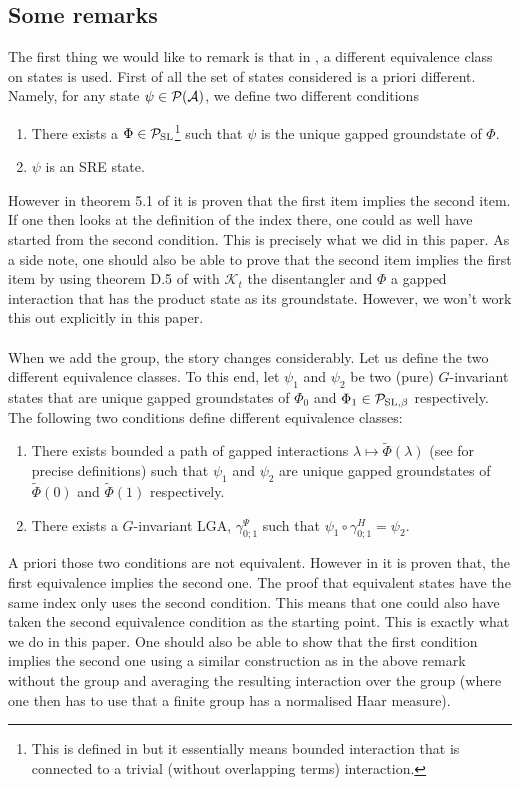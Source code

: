 \documentclass[12pt,a4paper,twoside]{article}
\numberwithin{equation}{section}
\begin{document}
\subsection{Some remarks}
The first thing we would like to remark is that in \cite{ogata2021h3gmathbb}, a different equivalence class on states is used. First of all the set of states considered is a priori different. Namely, for any state $\psi\in \mathcal P(\mathcal A)$, we define two different conditions
\begin{enumerate}
	\item There exists a $\Phi\in\mathcal P_{\text{SL}}$\footnote{This is defined in \cite{ogata2021h3gmathbb} but it essentially means bounded interaction that is connected to a trivial (without overlapping terms) interaction.} such that $\psi$ is the unique gapped groundstate of $\Phi$.
	\item $\psi$ is an SRE state.
\end{enumerate}
However in theorem 5.1 of \cite{ogata2021h3gmathbb} it is proven that the first item implies the second item. If one then looks at the definition of the index there, one could as well have started from the second condition. This is precisely what we did in this paper. As a side note, one should also be able to prove that the second item implies the first item by using theorem D.5 of \cite{ogata2021h3gmathbb} with $\mathcal{K}_t$ the disentangler and $\Phi$ a gapped interaction that has the product state as its groundstate. However, we won't work this out explicitly in this paper.\\\\
When we add the group, the story changes considerably. Let us define the two different equivalence classes. To this end, let $\psi_1$ and $\psi_2$ be two (pure) $G$-invariant states that are unique gapped groundstates of $\Phi_0$ and $\Phi_1\in\mathcal P_{\text{SL},\beta}$ respectively. The following two conditions define different equivalence classes:
\begin{enumerate}
	\item There exists bounded a path of gapped interactions $\lambda\mapsto\tilde\Phi(\lambda)$ (see \cite{ogata2021h3gmathbb} for precise definitions) such that $\psi_1$ and $\psi_2$ are unique gapped groundstates of $\tilde{\Phi}(0)$ and $\tilde{\Phi}(1)$ respectively.
	\item There exists a $G$-invariant LGA, $\gamma^\Psi_{0;1}$ such that $\psi_1\circ\gamma^H_{0;1}=\psi_2$.
\end{enumerate}
A priori those two conditions are not equivalent. However in \cite{ogata2021h3gmathbb} it is proven that, the first equivalence implies the second one. The proof that equivalent states have the same index only uses the second condition. This means that one could also have taken the second equivalence condition as the starting point. This is exactly what we do in this paper. One should also be able to show that the first condition implies the second one using a similar construction as in the above remark without the group and averaging the resulting interaction over the group (where one then has to use that a finite group has a normalised Haar measure).
\end{document}
